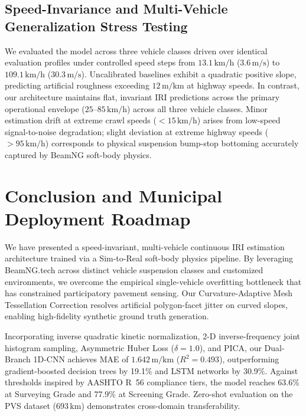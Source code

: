 \documentclass[conference]{IEEEtran}
\begin{document}
\subsection{Speed-Invariance and Multi-Vehicle Generalization Stress Testing}
We evaluated the model across three vehicle classes driven over identical evaluation profiles under controlled speed steps from $13.1\,\text{km/h}$ ($3.6\,\text{m/s}$) to $109.1\,\text{km/h}$ ($30.3\,\text{m/s}$). Uncalibrated baselines exhibit a quadratic positive slope, predicting artificial roughness exceeding $12\,\text{m/km}$ at highway speeds. In contrast, our architecture maintains flat, invariant IRI predictions across the primary operational envelope ($25$--$85\,\text{km/h}$) across all three vehicle classes. Minor estimation drift at extreme crawl speeds ($<15\,\text{km/h}$) arises from low-speed signal-to-noise degradation; slight deviation at extreme highway speeds ($>95\,\text{km/h}$) corresponds to physical suspension bump-stop bottoming accurately captured by BeamNG soft-body physics.

\section{Conclusion and Municipal Deployment Roadmap}

We have presented a speed-invariant, multi-vehicle continuous IRI estimation architecture trained via a Sim-to-Real soft-body physics pipeline. By leveraging BeamNG.tech across distinct vehicle suspension classes and customized environments, we overcome the empirical single-vehicle overfitting bottleneck that has constrained participatory pavement sensing. Our Curvature-Adaptive Mesh Tessellation Correction resolves artificial polygon-facet jitter on curved slopes, enabling high-fidelity synthetic ground truth generation.

Incorporating inverse quadratic kinetic normalization, 2-D inverse-frequency joint histogram sampling, Asymmetric Huber Loss ($\delta=1.0$), and PICA, our Dual-Branch 1D-CNN achieves MAE of $1.642\,\text{m/km}$ ($R^2 = 0.493$), outperforming gradient-boosted decision trees by 19.1\% and LSTM networks by 30.9\%. Against thresholds inspired by AASHTO R~56 compliance tiers, the model reaches 63.6\% at Surveying Grade and 77.9\% at Screening Grade. Zero-shot evaluation on the PVS dataset ($693\,\text{km}$) demonstrates cross-domain transferability.
\end{document}
